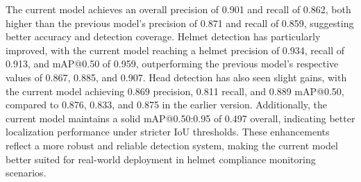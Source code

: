 \noindent\hspace{2.5em}The current model achieves an overall precision of 0.901 and recall of 0.862, both higher than the previous model’s precision of 0.871 and recall of 0.859, suggesting better accuracy and detection coverage. Helmet detection has particularly improved, with the current model reaching a helmet precision of 0.934, recall of 0.913, and mAP@0.50 of 0.959, outperforming the previous model’s respective values of 0.867, 0.885, and 0.907. Head detection has also seen slight gains, with the current model achieving 0.869 precision, 0.811 recall, and 0.889 mAP@0.50, compared to 0.876, 0.833, and 0.875 in the earlier version. Additionally, the current model maintains a solid mAP@0.50:0.95 of 0.497 overall, indicating better localization performance under stricter IoU thresholds. These enhancements reflect a more robust and reliable detection system, making the current model better suited for real-world deployment in helmet compliance monitoring scenarios.
